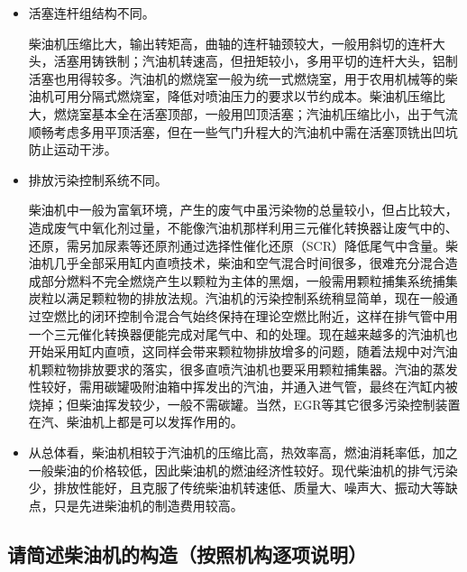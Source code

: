 \documentclass[UTF8]{ctexart}
\numberwithin{figure}{section}
\numberwithin{table}{section}
\begin{document}
\begin{itemize}
	\item 活塞连杆组结构不同。

	      柴油机压缩比大，输出转矩高，曲轴的连杆轴颈较大，一般用斜切的连杆大头，活塞用铸铁制；汽油机转速高，但扭矩较小，多用平切的连杆大头，铝制活塞也用得较多。汽油机的燃烧室一般为统一式燃烧室，用于农用机械等的柴油机可用分隔式燃烧室，降低对喷油压力的要求以节约成本。柴油机压缩比大，燃烧室基本全在活塞顶部，一般用凹顶活塞；汽油机压缩比小，出于气流顺畅考虑多用平顶活塞，但在一些气门升程大的汽油机中需在活塞顶铣出凹坑防止运动干涉。

	\item 排放污染控制系统不同。

	      柴油机中一般为富氧环境，产生的废气中虽污染物的总量较小，但占比较大，造成废气中氧化剂过量，不能像汽油机那样利用三元催化转换器让废气中的、还原，需另加尿素等还原剂通过选择性催化还原（SCR）降低尾气中含量。柴油机几乎全部采用缸内直喷技术，柴油和空气混合时间很多，很难充分混合造成部分燃料不完全燃烧产生以颗粒为主体的黑烟，一般需用颗粒捕集系统捕集炭粒以满足颗粒物的排放法规。汽油机的污染控制系统稍显简单，现在一般通过空燃比的闭环控制令混合气始终保持在理论空燃比附近，这样在排气管中用一个三元催化转换器便能完成对尾气中、和的处理。现在越来越多的汽油机也开始采用缸内直喷，这同样会带来颗粒物排放增多的问题，随着法规中对汽油机颗粒物排放要求的落实，很多直喷汽油机也要采用颗粒捕集器。汽油的蒸发性较好，需用碳罐吸附油箱中挥发出的汽油，并通入进气管，最终在汽缸内被烧掉；但柴油挥发较少，一般不需碳罐。当然，EGR等其它很多污染控制装置在汽、柴油机上都是可以发挥作用的。

	\item 从总体看，柴油机相较于汽油机的压缩比高，热效率高，燃油消耗率低，加之一般柴油的价格较低，因此柴油机的燃油经济性较好。现代柴油机的排气污染少，排放性能好，且克服了传统柴油机转速低、质量大、噪声大、振动大等缺点，只是先进柴油机的制造费用较高。
\end{itemize}

\subsection{请简述柴油机的构造（按照机构逐项说明）}
\end{document}
